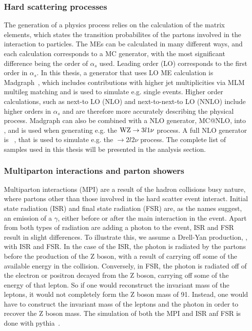 \subsubsection*{Hard scattering processes}
\noindent
\justify
The generation of a physics process relies on the calculation of the matrix elements, which states the transition probabilites of the partons involved in the interaction to particles. 
The MEs can be calculated in many different ways, and each calculation corresponds to a MC generator, with the most significant difference being the order of $\alpha_{s}$ used. 
Leading order (LO) corresponds to the first order in $\alpha_{s}$. 
In this thesis, a generator that uses LO ME calculation is Madgraph~\cite{Alwall:2014hca}, which includes contributions with higher jet multiplicities via MLM~\cite{Mangano:2006rw} multileg matching and is used to simulate e.g. single \PGg events.
Higher order calculations, such as next-to LO (NLO) and next-to-next-to LO (NNLO) include higher orders in $\alpha_{s}$ and are therefore more accurately describing the physical process. 
Madgraph can also be combined with a NLO generator, MC@NLO, into \MGvATNLO, and is used when generating e.g. the $\mathrm{W}\mathrm{Z}\rightarrow 3l1\nu$ process.
A full NLO generator is \POWHEG~\cite{Oleari:2010nx,Alioli:2009je}, that is used to simulate e.g. the \ttbar$\rightarrow2l2\nu$ process. 
The complete list of samples used in this thesis will be presented in the analysis section.
\subsubsection*{Multiparton interactions and parton showers}
\noindent
\justify
Multiparton interactions (MPI) are a result of the hadron collisions busy nature, where partons other than those involved in the hard scatter event interact. 
Initial state radiation (ISR) and final state radiation (FSR) are, as the names suggest, an emission of a $\gamma$, either before or after the main interaction in the event.
Apart from both types of radiation are adding a photon to the event, ISR and FSR result in slight differences. To illustrate this, we assume a Drell-Yan production, \Zee, with ISR and FSR. 
In the case of the ISR, the photon is radiated by the partons before the production of the Z boson, with a result of carrying off some of the available energy in the collision. 
Conversely, in FSR, the photon is radiated off of the electron or positron decayed from the Z boson, carrying off some of the energy of that lepton. 
So if one would reconstruct the invariant mass of the leptons, it would not completely form the Z boson mass of 91\GeV. 
Instead, one would have to construct the invariant mass of the leptons and the photon in order to recover the Z boson mass. 
The simulation of both the MPI and ISR anf FSR is done with {\sc pythia}~\cite{Sjostrand:2014zea}. 

